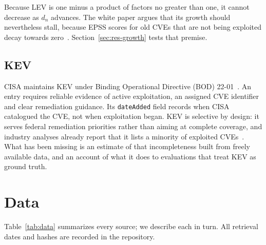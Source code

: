 Because LEV is one minus a product of factors no greater than one, it cannot
decrease as $d_n$ advances. The white paper argues that its growth should
nevertheless stall, because EPSS scores for old CVEs that are not being
exploited decay towards zero~\cite[Secs.~6 and~7.2]{mell2025lev}. Section~\ref{sec:res-growth}
tests that premise.

\subsection{KEV}

CISA maintains KEV under Binding Operational Directive (BOD)
22-01~\cite{cisa2022kev}. An entry requires reliable evidence of active
exploitation, an assigned CVE identifier and clear remediation guidance. Its
\texttt{dateAdded} field records when CISA catalogued the CVE, not when
exploitation began. KEV is selective by design: it serves federal remediation
priorities rather than aiming at complete coverage, and industry analyses
already report that it lists a minority of exploited
CVEs~\cite{roytman2026kevparadox,garrity2026state,beardsley2025kevology}. What
has been missing is an estimate of that incompleteness built from freely available data,
and an account of what it does to evaluations that treat KEV as ground truth.

\section{Data}\label{sec:data}

Table~\ref{tab:data} summarizes every source; we describe each in turn. All
retrieval dates and hashes are recorded in the repository.

